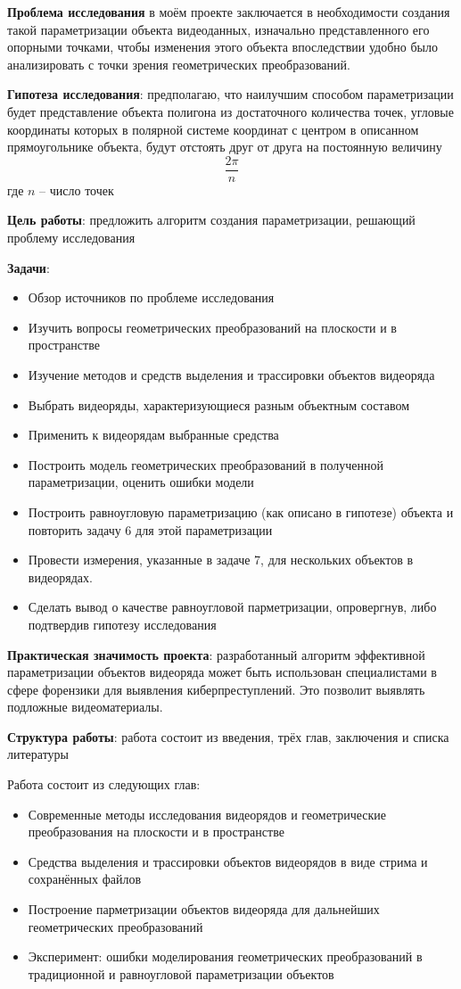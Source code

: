 \documentclass[]{article}
\begin{document}
\textbf{Проблема исследования} в моём проекте заключается в необходимости создания такой параметризации объекта видеоданных, изначально представленного его опорными точками, чтобы изменения этого объекта впоследствии удобно было анализировать с точки зрения геометрических преобразований. 

\textbf{Гипотеза исследования}: предполагаю, что наилучшим способом параметризации будет представление объекта полигона из достаточного количества точек, угловые координаты которых в полярной системе координат с центром в описанном прямоугольнике объекта, будут отстоять друг от друга на постоянную величину  $$\frac{2\pi}{n}$$ где $n$ – число точек

\textbf{Цель работы}: предложить алгоритм создания параметризации, решающий проблему исследования

\textbf{Задачи}: 
\begin{itemize}[noitemsep]
\item Обзор источников по проблеме исследования
\item Изучить вопросы геометрических преобразований на плоскости и в пространстве
\item Изучение методов и средств выделения и трассировки объектов видеоряда
\item Выбрать видеоряды, характеризующиеся разным объектным составом
\item Применить к видеорядам выбранные средства
\item Построить модель геометрических преобразований в полученной параметризации, оценить ошибки модели
\item Построить равноугловую параметризацию (как описано в гипотезе) объекта и повторить задачу 6 для этой параметризации
\item Провести измерения, указанные в задаче 7, для нескольких объектов в видеорядах.
\item Сделать вывод о качестве равноугловой парметризации, опровергнув, либо подтвердив гипотезу исследования
\end{itemize}
  
\textbf{Практическая значимость проекта}:
разработанный алгоритм эффективной параметризации объектов видеоряда может быть использован специалистами в сфере форензики для выявления киберпреступлений. Это позволит выявлять подложные видеоматериалы.

\textbf{Структура работы}: работа состоит из введения, трёх глав, заключения и  списка литературы 

Работа состоит из следующих глав:
\begin{itemize}[noitemsep]
	\item Современные методы исследования видеорядов и геометрические преобразования на плоскости и в пространстве
	\item Средства выделения и трассировки объектов видеорядов в виде стрима и сохранённых файлов
	\item Построение парметризации объектов видеоряда для дальнейших геометрических преобразований
	\item Эксперимент: ошибки моделирования геометрических преобразований в традиционной и равноугловой параметризации объектов 
\end{itemize}
\end{document}
